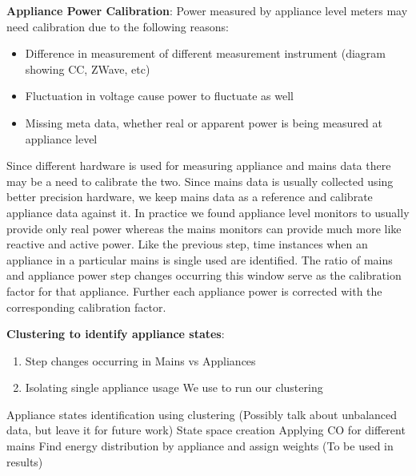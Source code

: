 \documentclass[conference]{IEEEtran}
\begin{document}
\textbf{Appliance Power Calibration}: 
Power measured by appliance level meters may need calibration due to the following reasons:
\begin{itemize}
\item Difference in measurement of different measurement instrument (diagram showing CC, ZWave, etc) \cite{berges2008}
\item Fluctuation in voltage cause power to fluctuate as well
\item Missing meta data, whether real or apparent power is being measured at appliance level

\end{itemize}Since different hardware is used for measuring appliance and mains data there may be a need to calibrate the two. Since mains data is usually collected using better precision hardware, we keep mains data as a reference and calibrate appliance data against it. In practice we found appliance level monitors to usually provide only real power whereas the mains monitors can provide much more like reactive and active power. Like the previous step, time instances when an appliance in a particular mains is single used are identified. The ratio of mains and appliance power step changes occurring this window serve as the calibration factor for that appliance. Further each appliance power is corrected with the corresponding calibration factor.

\textbf{Clustering to identify appliance states}:
\begin{enumerate}
\item Step changes occurring in Mains vs Appliances
\item Isolating single appliance usage
We use \cite{kmeansplusplus} to run our clustering
\end{enumerate}
Appliance states identification using clustering (Possibly talk about unbalanced data, but leave it for future work)
State space creation
Applying CO for different mains
Find energy distribution by appliance and assign weights (To be used in results)
\end{document}
